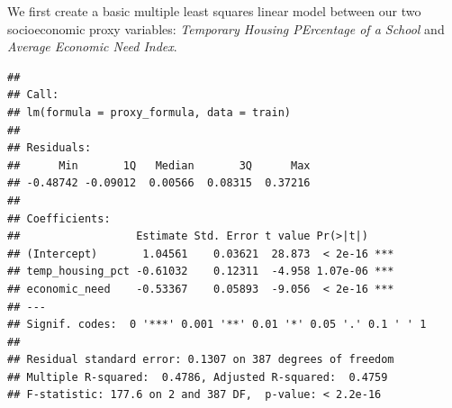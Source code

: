 \documentclass[
  man]{apa6}
\begin{document}
We first create a basic multiple least squares linear model between our two socioeconomic proxy variables: \emph{Temporary Housing PErcentage of a School} and \emph{Average Economic Need Index}.

\begin{verbatim}
## 
## Call:
## lm(formula = proxy_formula, data = train)
## 
## Residuals:
##      Min       1Q   Median       3Q      Max 
## -0.48742 -0.09012  0.00566  0.08315  0.37216 
## 
## Coefficients:
##                  Estimate Std. Error t value Pr(>|t|)    
## (Intercept)       1.04561    0.03621  28.873  < 2e-16 ***
## temp_housing_pct -0.61032    0.12311  -4.958 1.07e-06 ***
## economic_need    -0.53367    0.05893  -9.056  < 2e-16 ***
## ---
## Signif. codes:  0 '***' 0.001 '**' 0.01 '*' 0.05 '.' 0.1 ' ' 1
## 
## Residual standard error: 0.1307 on 387 degrees of freedom
## Multiple R-squared:  0.4786, Adjusted R-squared:  0.4759 
## F-statistic: 177.6 on 2 and 387 DF,  p-value: < 2.2e-16
\end{verbatim}
\end{document}

